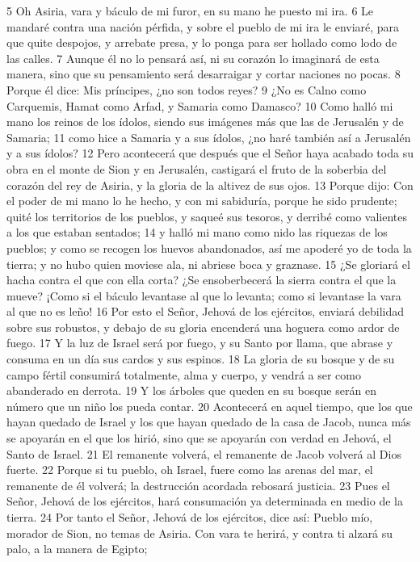 5 Oh Asiria, vara y báculo de mi furor, en su mano he puesto mi ira.
6 Le mandaré contra una nación pérfida, y sobre el pueblo de mi ira le enviaré, para que quite despojos, y arrebate presa, y lo ponga para ser hollado como lodo de las calles. 
7 Aunque él no lo pensará así, ni su corazón lo imaginará de esta manera, sino que su pensamiento será desarraigar y cortar naciones no pocas.
8 Porque él dice: Mis príncipes, ¿no son todos reyes?
9 ¿No es Calno como Carquemis, Hamat como Arfad, y Samaria como Damasco?
10 Como halló mi mano los reinos de los ídolos, siendo sus imágenes más que las de Jerusalén y de Samaria;
11 como hice a Samaria y a sus ídolos, ¿no haré también así a Jerusalén y a sus ídolos?
12 Pero acontecerá que después que el Señor haya acabado toda su obra en el monte de Sion y en Jerusalén, castigará el fruto de la soberbia del corazón del rey de Asiria, y la gloria de la altivez de sus ojos.
13 Porque dijo: Con el poder de mi mano lo he hecho, y con mi sabiduría, porque he sido prudente; quité los territorios de los pueblos, y saqueé sus tesoros, y derribé como valientes a los que estaban sentados;
14 y halló mi mano como nido las riquezas de los pueblos; y como se recogen los huevos abandonados, así me apoderé yo de toda la tierra; y no hubo quien moviese ala, ni abriese boca y graznase.
15 ¿Se gloriará el hacha contra el que con ella corta? ¿Se ensoberbecerá la sierra contra el que la mueve? ¡Como si el báculo levantase al que lo levanta; como si levantase la vara al que no es leño!
16 Por esto el Señor, Jehová de los ejércitos, enviará debilidad sobre sus robustos, y debajo de su gloria encenderá una hoguera como ardor de fuego.
17 Y la luz de Israel será por fuego, y su Santo por llama, que abrase y consuma en un día sus cardos y sus espinos.
18 La gloria de su bosque y de su campo fértil consumirá totalmente, alma y cuerpo, y vendrá a ser como abanderado en derrota.
19 Y los árboles que queden en su bosque serán en número que un niño los pueda contar.
20 Acontecerá en aquel tiempo, que los que hayan quedado de Israel y los que hayan quedado de la casa de Jacob, nunca más se apoyarán en el que los hirió, sino que se apoyarán con verdad en Jehová, el Santo de Israel.
21 El remanente volverá, el remanente de Jacob volverá al Dios fuerte.
22 Porque si tu pueblo, oh Israel, fuere como las arenas del mar, el remanente de él volverá; la destrucción acordada rebosará justicia.
23 Pues el Señor, Jehová de los ejércitos, hará consumación ya determinada en medio de la tierra. 
24 Por tanto el Señor, Jehová de los ejércitos, dice así: Pueblo mío, morador de Sion, no temas de Asiria. Con vara te herirá, y contra ti alzará su palo, a la manera de Egipto;
